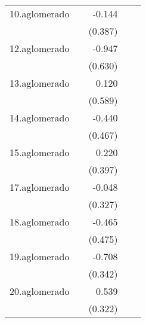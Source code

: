 {\begin{longtable}{l*{4}{D{.}{.}{-1}}}
\addlinespace
10.aglomerado&                     &      -0.144         &                     &                     \\
            &                     &     (0.387)         &                     &                     \\
\addlinespace
12.aglomerado&                     &      -0.947         &                     &                     \\
            &                     &     (0.630)         &                     &                     \\
\addlinespace
13.aglomerado&                     &       0.120         &                     &                     \\
            &                     &     (0.589)         &                     &                     \\
\addlinespace
14.aglomerado&                     &      -0.440         &                     &                     \\
            &                     &     (0.467)         &                     &                     \\
\addlinespace
15.aglomerado&                     &       0.220         &                     &                     \\
            &                     &     (0.397)         &                     &                     \\
\addlinespace
17.aglomerado&                     &      -0.048         &                     &                     \\
            &                     &     (0.327)         &                     &                     \\
\addlinespace
18.aglomerado&                     &      -0.465         &                     &                     \\
            &                     &     (0.475)         &                     &                     \\
\addlinespace
19.aglomerado&                     &      -0.708\sym{*}  &                     &                     \\
            &                     &     (0.342)         &                     &                     \\
\addlinespace
20.aglomerado&                     &       0.539         &                     &                     \\
            &                     &     (0.322)         &                     &                     \\

\end{longtable}}
